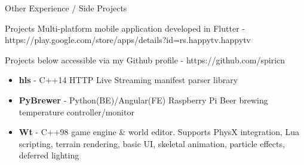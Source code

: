 \documentclass[]{mcdowellcv}
\begin{document}
	\begin{cvsection}{Other Experience / Side Projects}
		\begin{cvsubsection}{Projects}{}{}
			Multi-platform mobile application developed in Flutter - https://play.google.com/store/apps/details?id=rs.happytv.happytv

			Projects below accessible via my Github profile - https://github.com/spiricn
			\begin{itemize}
				\item \textbf{hls} - C++14 HTTP Live Streaming manifest parser library
				\item \textbf{PyBrewer} - Python(BE)/Angular(FE) Raspberry Pi Beer brewing temperature controller/monitor
				\item \textbf{Wt} - C++98 game engine \& world editor. Supports PhysX integration, Lua scripting, terrain rendering, basic UI, skeletal animation, particle effects, deferred lighting
			\end{itemize}

		\end{cvsubsection}
	\end{cvsection}
\end{document}
